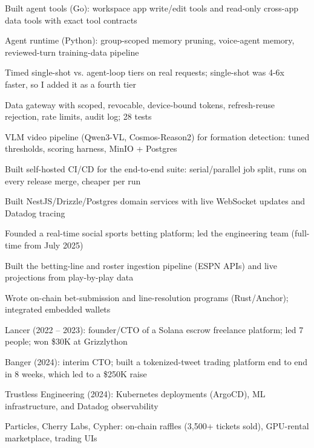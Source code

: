 \documentclass[print]{jack-resume}
\begin{document}
\begin{tightemize}
    \item Built agent tools (Go): workspace app write/edit tools and read-only cross-app data tools with exact tool contracts
    \item Agent runtime (Python): group-scoped memory pruning, voice-agent memory, reviewed-turn training-data pipeline
    \item Timed single-shot vs. agent-loop tiers on real requests; single-shot was 4-6x faster, so I added it as a fourth tier
    \item Data gateway with scoped, revocable, device-bound tokens, refresh-reuse rejection, rate limits, audit log; 28 tests
    \item VLM video pipeline (Qwen3-VL, Cosmos-Reason2) for formation detection: tuned thresholds, scoring harness, MinIO + Postgres
    \item Built self-hosted CI/CD for the end-to-end suite: serial/parallel job split, runs on every release merge, cheaper per run
\end{tightemize}
\sectionsep

\begin{tightemize}
    \item Built NestJS/Drizzle/Postgres domain services with live WebSocket updates and Datadog tracing
    \item Founded a real-time social sports betting platform; led the engineering team (full-time from July 2025)
    \item Built the betting-line and roster ingestion pipeline (ESPN APIs) and live projections from play-by-play data
    \item Wrote on-chain bet-submission and line-resolution programs (Rust/Anchor); integrated embedded wallets
\end{tightemize}
\sectionsep

\begin{tightemize}
    \item Lancer (2022 – 2023): founder/CTO of a Solana escrow freelance platform; led 7 people; won \$30K at Grizzlython
    \item Banger (2024): interim CTO; built a tokenized-tweet trading platform end to end in 8 weeks, which led to a \$250K raise
    \item Trustless Engineering (2024): Kubernetes deployments (ArgoCD), ML infrastructure, and Datadog observability
    \item Particles, Cherry Labs, Cypher: on-chain raffles (3,500+ tickets sold), GPU-rental marketplace, trading UIs
\end{tightemize}
\sectionsep
\end{document}
